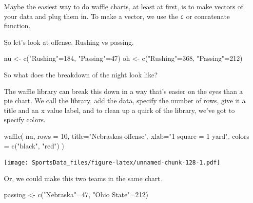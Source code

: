 \documentclass[
]{book}
\newenvironment{Shaded}{\begin{snugshade}}{\end{snugshade}}
\newcommand{\AttributeTok}[1]{\textcolor[rgb]{0.77,0.63,0.00}{#1}}
\newcommand{\DecValTok}[1]{\textcolor[rgb]{0.00,0.00,0.81}{#1}}
\newcommand{\FunctionTok}[1]{\textcolor[rgb]{0.00,0.00,0.00}{#1}}
\newcommand{\NormalTok}[1]{#1}
\newcommand{\OtherTok}[1]{\textcolor[rgb]{0.56,0.35,0.01}{#1}}
\newcommand{\StringTok}[1]{\textcolor[rgb]{0.31,0.60,0.02}{#1}}
\begin{document}
Maybe the easiest way to do waffle charts, at least at first, is to make vectors of your data and plug them in. To make a vector, we use the \texttt{c} or concatenate function.

So let's look at offense. Rushing vs passing.

\begin{Shaded}
\begin{Highlighting}[]
\NormalTok{nu }\OtherTok{\textless{}{-}} \FunctionTok{c}\NormalTok{(}\StringTok{"Rushing"}\OtherTok{=}\DecValTok{184}\NormalTok{, }\StringTok{"Passing"}\OtherTok{=}\DecValTok{47}\NormalTok{)}
\NormalTok{oh }\OtherTok{\textless{}{-}} \FunctionTok{c}\NormalTok{(}\StringTok{"Rushing"}\OtherTok{=}\DecValTok{368}\NormalTok{, }\StringTok{"Passing"}\OtherTok{=}\DecValTok{212}\NormalTok{)}
\end{Highlighting}
\end{Shaded}

So what does the breakdown of the night look like?

The waffle library can break this down in a way that's easier on the eyes than a pie chart. We call the library, add the data, specify the number of rows, give it a title and an x value label, and to clean up a quirk of the library, we've got to specify colors.

\begin{Shaded}
\begin{Highlighting}[]
\FunctionTok{waffle}\NormalTok{(}
\NormalTok{        nu, }
        \AttributeTok{rows =} \DecValTok{10}\NormalTok{, }
        \AttributeTok{title=}\StringTok{"Nebraska\textquotesingle{}s offense"}\NormalTok{, }
        \AttributeTok{xlab=}\StringTok{"1 square = 1 yard"}\NormalTok{, }
        \AttributeTok{colors =} \FunctionTok{c}\NormalTok{(}\StringTok{"black"}\NormalTok{, }\StringTok{"red"}\NormalTok{)}
\NormalTok{)}
\end{Highlighting}
\end{Shaded}

\texttt{[image: SportsData\_files/figure-latex/unnamed-chunk-128-1.pdf]}

Or, we could make this two teams in the same chart.

\begin{Shaded}
\begin{Highlighting}[]
\NormalTok{passing }\OtherTok{\textless{}{-}} \FunctionTok{c}\NormalTok{(}\StringTok{"Nebraska"}\OtherTok{=}\DecValTok{47}\NormalTok{, }\StringTok{"Ohio State"}\OtherTok{=}\DecValTok{212}\NormalTok{)}
\end{Highlighting}
\end{Shaded}
\end{document}
